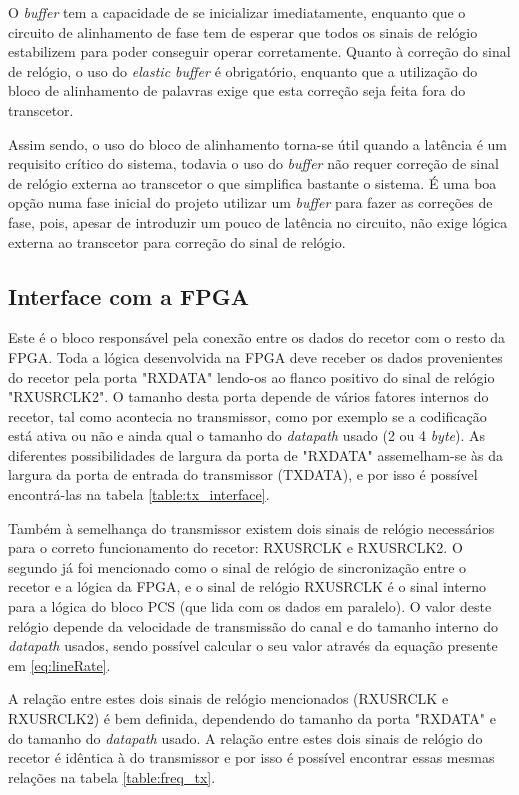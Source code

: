 O \textit{buffer} tem a capacidade de se inicializar imediatamente, enquanto que o circuito de alinhamento de fase tem de esperar que todos os sinais de relógio estabilizem para poder conseguir operar corretamente. Quanto à correção do sinal de relógio, o uso do\textit{ elastic buffer} é obrigatório, enquanto que a utilização do bloco de alinhamento de palavras exige que esta correção seja feita fora do transcetor.

Assim sendo, o uso do bloco de alinhamento torna-se útil quando a latência é um requisito crítico do sistema, todavia o uso do \textit{buffer} não requer correção de sinal de relógio externa ao transcetor o que simplifica bastante o sistema. É uma boa opção numa fase inicial do projeto utilizar um \textit{buffer} para fazer as correções de fase, pois, apesar de introduzir um pouco de latência no circuito, não exige lógica externa ao transcetor para correção do sinal de relógio.

\subsection{Interface com a FPGA}

Este é o bloco responsável pela conexão entre os dados do recetor com o resto da FPGA. Toda a lógica desenvolvida na FPGA deve receber os dados provenientes do recetor pela porta "RXDATA" lendo-os ao flanco positivo do sinal de relógio "RXUSRCLK2". O tamanho desta porta depende de vários fatores internos do recetor, tal como acontecia no transmissor,  como por exemplo se a codificação está ativa ou não e ainda qual o tamanho do \textit{datapath} usado (2 ou 4 \textit{byte}). As diferentes possibilidades de largura da porta de "RXDATA" assemelham-se às da largura da porta de entrada do transmissor (TXDATA), e por isso é possível encontrá-las na tabela \ref{table:tx_interface}.

Também à semelhança do transmissor existem dois sinais de relógio necessários para o correto funcionamento do recetor: RXUSRCLK e RXUSRCLK2. O segundo já foi mencionado como o sinal de relógio de sincronização entre o recetor e a lógica da FPGA, e o sinal de relógio RXUSRCLK é o sinal interno para a lógica do bloco PCS (que lida com os dados em paralelo). O valor deste relógio depende da velocidade de transmissão do canal e do tamanho interno do \textit{datapath} usados, sendo possível calcular o seu valor através da equação presente em \ref{eq:lineRate}.

A relação entre estes dois sinais de relógio mencionados (RXUSRCLK e RXUSRCLK2) é bem definida, dependendo do tamanho da porta "RXDATA" e do tamanho do \textit{datapath} usado.  A relação entre estes dois sinais de relógio do recetor é idêntica à do transmissor e por isso é possível encontrar essas mesmas relações na tabela \ref{table:freq_tx}.

